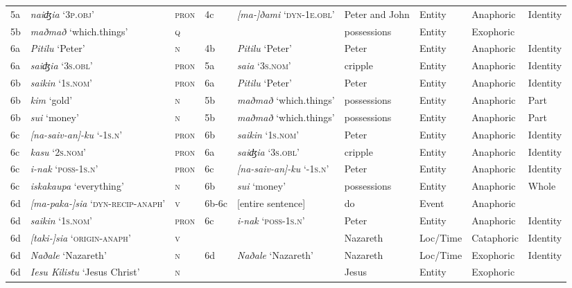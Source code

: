 \documentclass[output=paper
,modfonts
,nonflat]{langsci/langscibook}
\begin{document}
\begin{sidewaystable}
{\begin{tabular}{ll l lll lll}
	5a & \textit{naiʤia} ‘\textsc{3p.obj}’ & \textsc{pron} & 4c & \textit{[ma-]ðami} ‘\textsc{dyn-1e.obl}’ & Peter and John & Entity & Anaphoric & Identity\\
	5b & \textit{maðmað} ‘which.things’ & \textsc{q} & ~ & ~ & possessions & Entity & Exophoric & ~\\
	6a & \textit{Pitilu} ‘Peter’ & \textsc{n} & 4b & \textit{Pitilu} ‘Peter’ & Peter & Entity & Anaphoric & Identity\\
	6a & \textit{saiʤia} ‘\textsc{3s.obl}’ & \textsc{pron} & 5a & \textit{saia} ‘\textsc{3s.nom}’ & cripple & Entity & Anaphoric & Identity\\
	6b & \textit{saikin} ‘\textsc{1s.nom}’ & \textsc{pron} & 6a & \textit{Pitilu} ‘Peter’ & Peter & Entity & Anaphoric & Identity\\
	6b & \textit{kim} ‘gold’ & \textsc{n} & 5b & \textit{maðmað} ‘which.things’ & possessions & Entity & Anaphoric & Part\\
	6b & \textit{sui} ‘money’ & \textsc{n} & 5b & \textit{maðmað} ‘which.things’ & possessions & Entity & Anaphoric & Part\\
	6c & \textit{[na-saiv-an]-ku} ‘-\textsc{1s.n}’ & \textsc{pron} & 6b & \textit{saikin} ‘\textsc{1s.nom}’ & Peter & Entity & Anaphoric & Identity\\
	6c & \textit{kasu} ‘\textsc{2s.nom}’ & \textsc{pron} & 6a & \textit{saiʤia} ‘\textsc{3s.obl}’ & cripple & Entity & Anaphoric & Identity\\
	6c & \textit{i-nak} ‘\textsc{poss-1s.n}’ & \textsc{pron} & 6c & \textit{[na-saiv-an]-ku} ‘-\textsc{1s.n}’ & Peter & Entity & Anaphoric & Identity\\
	6c & \textit{iskakaupa} ‘everything’ & \textsc{n} & 6b & \textit{sui} ‘money’ & possessions & Entity & Anaphoric & Whole\\
	6d & \textit{[ma-paka-]sia} ‘\textsc{dyn-recip-anaph}’ & \textsc{v} & 6b-6c & [entire sentence] & do & Event & Anaphoric & ~\\
	6d & \textit{saikin} ‘\textsc{1s.nom}’ & \textsc{pron} & 6c & \textit{i-nak} ‘\textsc{poss-1s.n}’ & Peter & Entity & Anaphoric & Identity\\
	6d & \textit{[taki-]sia} ‘\textsc{origin-anaph}’ & \textsc{v} & ~ & ~ & Nazareth & Loc/Time & Cataphoric & Identity\\
	6d & \textit{Naðale} ‘Nazareth’ & \textsc{n} & 6d & \textit{Naðale} ‘Nazareth’ & Nazareth & Loc/Time & Exophoric & Identity\\
	6d & \textit{Iesu Kilistu} ‘Jesus Christ’ & \textsc{n} &  & ~ & Jesus & Entity & Exophoric & ~\\

\end{tabular}}
\end{sidewaystable}
\end{document}
